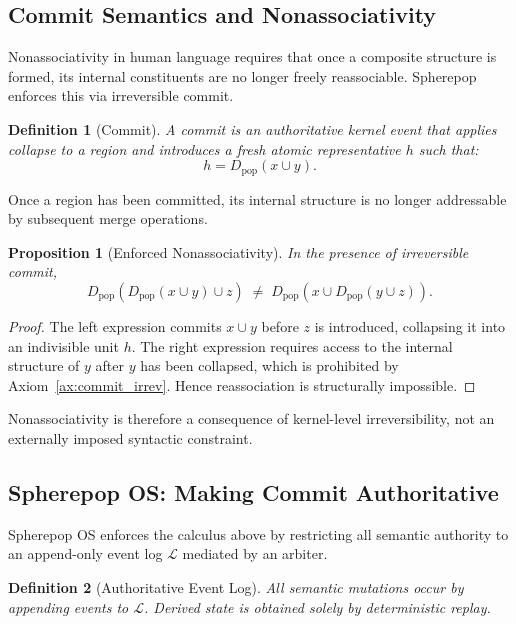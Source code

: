 \documentclass[11pt]{article}
\newtheorem{definition}{Definition}
\newtheorem{proposition}{Proposition}
\begin{document}
\subsection{Commit Semantics and Nonassociativity}

Nonassociativity in human language requires that once a composite structure is formed, its internal constituents are no longer freely reassociable. Spherepop enforces this via irreversible commit.

\begin{definition}[Commit]
A \emph{commit} is an authoritative kernel event that applies collapse to a region and introduces a fresh atomic representative $h$ such that:
\[
h = D_{\mathrm{pop}}(x \cup y).
\]
\end{definition}

\begin{axiom}
\label{ax:commit_irrev}
Once a region has been committed, its internal structure is no longer addressable by subsequent merge operations.
\end{axiom}

\begin{proposition}[Enforced Nonassociativity]
\label{prop:sp_nonassoc}
In the presence of irreversible commit,
\[
D_{\mathrm{pop}}(D_{\mathrm{pop}}(x \cup y) \cup z)
\;\neq\;
D_{\mathrm{pop}}(x \cup D_{\mathrm{pop}}(y \cup z)).
\]
\end{proposition}

\begin{proof}
The left expression commits $x \cup y$ before $z$ is introduced, collapsing it into an indivisible unit $h$. The right expression requires access to the internal structure of $y$ after $y$ has been collapsed, which is prohibited by Axiom~\ref{ax:commit_irrev}. Hence reassociation is structurally impossible.
\end{proof}

Nonassociativity is therefore a consequence of kernel-level irreversibility, not an externally imposed syntactic constraint.

\subsection{Spherepop OS: Making Commit Authoritative}

Spherepop OS enforces the calculus above by restricting all semantic authority to an append-only event log $\mathcal{L}$ mediated by an arbiter.

\begin{definition}[Authoritative Event Log]
All semantic mutations occur by appending events to $\mathcal{L}$. Derived state is obtained solely by deterministic replay.
\end{definition}
\end{document}
